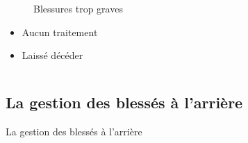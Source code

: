 \documentclass{beamer}
\renewcommand{\tiny}{\fontsize{6pt}{7pt}\selectfont}
\begin{document}
\begin{frame}
\begin{columns}
\begin{column}{0.3\linewidth}
\begin{figure}
								\caption{\tiny Blessures trop graves}
							\end{figure}
							\begin{itemize}
								\item Aucun traitement
								\item Laissé décéder
							\end{itemize}
						\end{column}
								
					\end{columns}
				\end{frame}
			
		
		
		\subsection{La gestion des blessés à l'arrière}
			
			\begin{wordframe} {La gestion des blessés à l'arrière}
			\end{wordframe}
		
\end{document}
